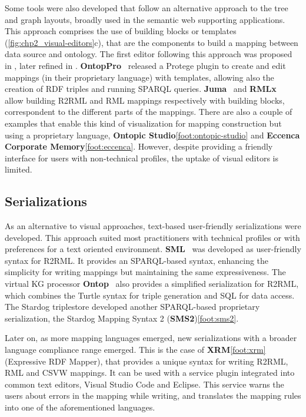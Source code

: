 
Some tools were also developed that follow an alternative approach to the tree and graph layouts, broadly used in the semantic web supporting applications. This approach comprises the use of building blocks or templates (\cref{fig:chp2_visual-editors}c), that are the components to build a mapping between data source and ontology. The first editor following this approach was proposed in \cite{sengupta2013editing}, later refined in \cite{pinkel2014best}. \textbf{OntopPro}~\parencite{calvanese2017ontop} released a Protege plugin to create and edit mappings (in their proprietary language) with templates, allowing also the creation of RDF triples and running SPARQL queries. \textbf{Juma}~\parencite{junior2017juma} and \textbf{RMLx}~\parencite{aryan2017rmlx} allow building R2RML and RML mappings respectively with building blocks, correspondent to the different parts of the mappings. There are also a couple of examples that enable this kind of visualization for mapping construction but using a proprietary language, \textbf{Ontopic Studio}\cref{foot:ontopic-studio} and \textbf{Eccenca Corporate Memory}\cref{foot:eccenca}. However, despite providing a friendly interface for users with non-technical profiles, the uptake of visual editors is limited.  

\subsection{Serializations}
\label{sec:chp2_serializations}

As an alternative to visual approaches, text-based user-friendly serializations were developed. This approach suited most practitioners with technical profiles or with preferences for a text oriented environment. 
\textbf{SML}~\parencite{Stadler2015sml} was developed as user-friendly syntax for R2RML. It provides an SPARQL-based syntax, enhancing the simplicity for writing mappings but maintaining the same expressiveness. 
The virtual KG processor \textbf{Ontop}~\parencite{calvanese2017ontop} also provides a simplified serialization for R2RML, which combines the Turtle syntax for triple generation and SQL for data access. 
The Stardog triplestore developed another SPARQL-based proprietary serialization, the Stardog Mapping Syntax 2 (\textbf{SMS2})\cref{foot:sms2}. 

Later on, as more mapping languages emerged, new serializations with a broader language compliance range emerged. This is the case of \textbf{XRM}\cref{foot:xrm} (Expressive RDF Mapper), that provides a unique syntax for writing R2RML, RML and CSVW mappings. It can be used with a service plugin integrated into common text editors, Visual Studio Code and Eclipse. This service warns the users about errors in the mapping while writing, and translates the mapping rules into one of the aforementioned languages. 

